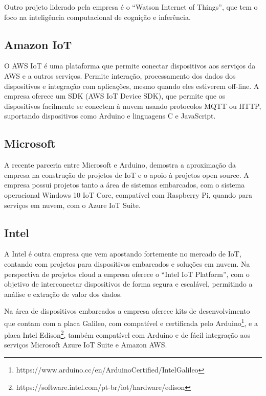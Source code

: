 Outro projeto liderado pela empresa é o ``Watson Internet of Things'',
que tem o foco na inteligência computacional de cognição e inferência.

\subsection{Amazon IoT}

O AWS IoT\cite{amazom:iot} é uma plataforma que permite conectar
dispositivos aos serviços da AWS e a outros serviços. Permite interação,
processamento dos dados dos dispositivos e integração com aplicações,
mesmo quando eles estiverem off-line. A empresa oferece um SDK (AWS
IoT Device SDK), que permite que os dispositivos facilmente se conectem
à nuvem usando protocolos MQTT ou HTTP, suportando dispositivos como
Arduino e linguagens C e JavaScript.

\subsection{Microsoft}

A recente parceria entre Microsoft e Arduino\cite{microsoft:arduino},
demostra a aproximação da empresa na construção de projetos de IoT
e o apoio à projetos open source. A empresa possui projetos tanto
a área de sistemas embarcados, com o sistema operacional Windows 10
IoT Core, compatível com Raspberry Pi, quando para serviços em nuvem,
com o Azure IoT Suite\cite{microsoft:iot}.

\subsection{Intel}

A Intel é outra empresa que vem apostando fortemente no mercado de
IoT, contando com projetos para dispositivos embarcados e soluções
em nuvem. Na perspectiva de projetos cloud a empresa oferece o ``Intel\textregistered{}
IoT Platform''\cite{intel:iot}, com o objetivo de interconectar
dispositivos de forma segura e escalável, permitindo a análise e extração
de valor dos dados.

Na área de dispositivos embarcados a empresa oferece kits de desenvolvimento
que contam com a placa Galileo, com compatível e certificada pelo
Arduino\footnote{https://www.arduino.cc/en/ArduinoCertified/IntelGalileo},
e a placa Intel\textregistered{} Edison\footnote{https://software.intel.com/pt-br/iot/hardware/edison},
também compatível com Arduino e de fácil integração aos serviços Microsoft
Azure IoT Suite e Amazon AWS.

